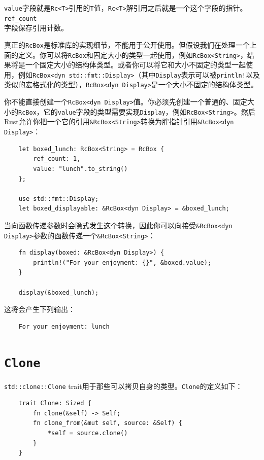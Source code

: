 \texttt{value}字段就是\texttt{Rc<T>}引用的\texttt{T}值，\texttt{Rc<T>}解引用之后就是一个这个字段的指针。\texttt{ref\_count}\\
字段保存引用计数。

真正的\texttt{RcBox}是标准库的实现细节，不能用于公开使用。但假设我们在处理一个上面的定义。你可以将\texttt{RcBox}和固定大小的类型一起使用，例如\texttt{RcBox<String>}，结果将是一个固定大小的结构体类型。或者你可以将它和大小不固定的类型一起使用，例如\texttt{RcBox<dyn std::fmt::Display>}（其中\texttt{Display}表示可以被\texttt{println!}以及类似的宏格式化的类型），\texttt{RcBox<dyn Display>}是一个大小不固定的结构体类型。

你不能直接创建一个\texttt{RcBox<dyn Display>}值。你必须先创建一个普通的、固定大小的\texttt{RcBox}，它的\texttt{value}字段的类型需要实现\texttt{Display}，例如\texttt{RcBox<String>}。然后Rust允许你把一个它的引用\texttt{\&RcBox<String>}转换为胖指针引用\texttt{\&RcBox<dyn Display>}：
\begin{verbatim}
    let boxed_lunch: RcBox<String> = RcBox {
        ref_count: 1,
        value: "lunch".to_string()
    };

    use std::fmt::Display;
    let boxed_displayable: &RcBox<dyn Display> = &boxed_lunch;
\end{verbatim}

当向函数传递参数时会隐式发生这个转换，因此你可以向接受\texttt{\&RcBox<dyn Display>}参数的函数传递一个\texttt{\&RcBox<String>}：
\begin{verbatim}
    fn display(boxed: &RcBox<dyn Display>) {
        println!("For your enjoyment: {}", &boxed.value);
    }

    display(&boxed_lunch);
\end{verbatim}

这将会产生下列输出：
\begin{verbatim}
    For your enjoyment: lunch
\end{verbatim}

\section{\texttt{Clone}}\label{clone}

\texttt{std::clone::Clone} trait用于那些可以拷贝自身的类型。\texttt{Clone}的定义如下：
\begin{verbatim}
    trait Clone: Sized {
        fn clone(&self) -> Self;
        fn clone_from(&mut self, source: &Self) {
            *self = source.clone()
        }
    }
\end{verbatim}

